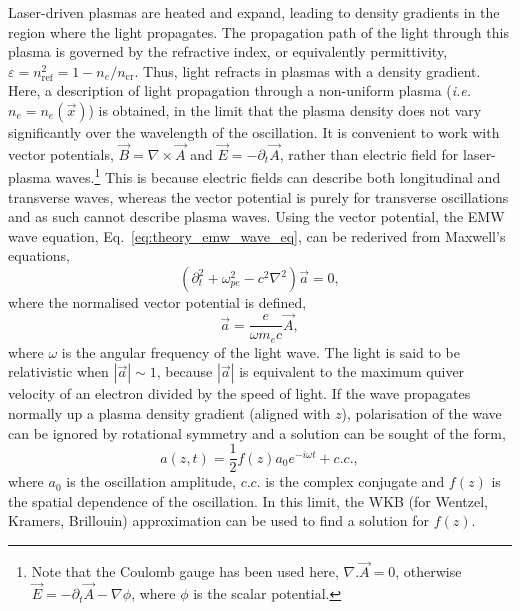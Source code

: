 Laser-driven plasmas are heated and expand, leading to density gradients in the region where the light propagates.
The propagation path of the light through this plasma is governed by the refractive index, or equivalently permittivity, $\varepsilon = n_{\text{ref}}^2=1-n_e/n_{\text{cr}}$.
Thus, light refracts in plasmas with a density gradient.
Here, a description of light propagation through a non-uniform plasma (\textit{i.e.} $n_e = n_e(\vec{x})$) is obtained, in the limit that the plasma density does not vary significantly over the wavelength of the oscillation.
It is convenient to work with vector potentials, $\vec{B} = \nabla\times\vec{A}$ and $\vec{E} = -\partial_t\vec{A}$, rather than electric field for laser-plasma waves.\footnote{Note that the Coulomb gauge has been used here, $\nabla.\vec{A}=0$, otherwise $\vec{E}=-\partial_t\vec{A}-\nabla\phi$, where $\phi$ is the scalar potential.}
This is because electric fields can describe both longitudinal and transverse waves, whereas the vector potential is purely for transverse oscillations and as such cannot describe plasma waves.
Using the vector potential, the \ac{EMW} wave equation, Eq.~\ref{eq:theory_emw_wave_eq}, can be rederived from Maxwell's equations,
\begin{equation}
    \label{eq:theory_waveeq_a}
    \left( \partial_t^2 + \omega_{pe}^2 - c^2\nabla^2 \right)\vec{a} = 0,
\end{equation}
where the normalised vector potential is defined,
\begin{equation}
    \vec{a} = \frac{e}{\omega m_e c}\vec{A},
\end{equation}
where $\omega$ is the angular frequency of the light wave.
The light is said to be relativistic when $|\vec{a}|\sim1$, because $|\vec{a}|$ is equivalent to the maximum quiver velocity of an electron divided by the speed of light.
If the wave propagates normally up a plasma density gradient (aligned with $z$), polarisation of the wave can be ignored by rotational symmetry and a solution can be sought of the form,
\begin{equation}
    \label{eq:theory_fz}
    a(z,t) = \frac{1}{2} f(z) a_0e^{-i\omega t} + c.c.,
\end{equation}
where $a_0$ is the oscillation amplitude, $c.c.$ is the complex conjugate and $f(z)$ is the spatial dependence of the oscillation.
In this limit, the WKB (for Wentzel, Kramers, Brillouin) approximation can be used to find a solution for $f(z)$.

